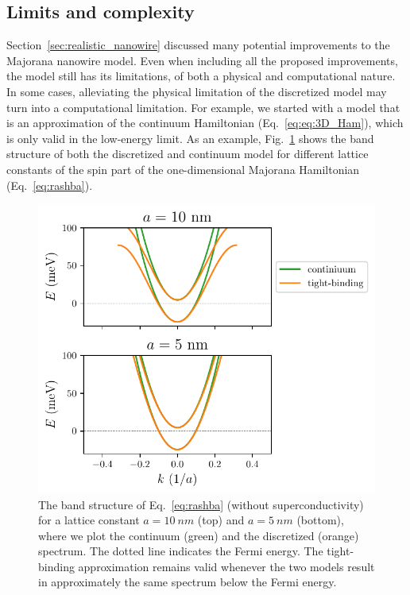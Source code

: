 \subsection{Limits and complexity}
Section~\ref{sec:realistic_nanowire} discussed many potential improvements to the Majorana nanowire model.
Even when including all the proposed improvements, the model still has its limitations, of both a physical and computational nature.
In some cases, alleviating the physical limitation of the discretized model may turn into a computational limitation.
For example, we started with a model that is an approximation of the continuum Hamiltonian (Eq.~\eqref{eq:eq:3D_Ham}), which is only valid in the low-energy limit.
As an example, Fig.~\ref{fig:discretization-approximation} shows the band structure of both the discretized and continuum model for different lattice constants of the spin part of the one-dimensional Majorana Hamiltonian (Eq.~\eqref{eq:rashba}).
\begin{figure}[!htb]
\begin{center}
\includegraphics{chapter_introduction/figures/discretization-approximation.pdf}
\caption{
The band structure of Eq.~\eqref{eq:rashba} (without superconductivity) for a lattice constant $a=\SI{10}{nm}$ (top) and $a=\SI{5}{nm}$ (bottom), where we plot the continuum (green) and the discretized (orange) spectrum.
The dotted line indicates the Fermi energy.
The tight-binding approximation remains valid whenever the two models result in approximately the same spectrum below the Fermi energy.
\label{fig:discretization-approximation}}
\end{center}
\end{figure}

